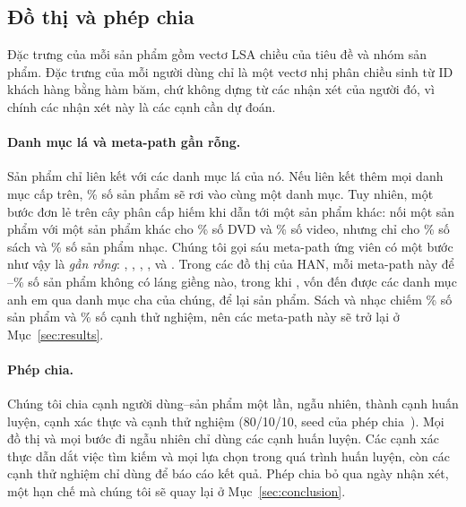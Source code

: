 \subsection{Đồ thị và phép chia}

Đặc trưng của mỗi sản phẩm gồm vectơ
LSA  chiều của tiêu đề và nhóm sản phẩm. Đặc trưng của mỗi người dùng
chỉ là một vectơ nhị phân  chiều sinh từ ID khách hàng bằng hàm băm, chứ không dựng từ các nhận xét của người đó, vì chính các nhận xét
này là các cạnh cần dự đoán.

\paragraph{Danh mục lá và meta-path gần rỗng.} Sản phẩm chỉ liên kết với các danh mục lá của nó.
Nếu liên kết thêm mọi danh mục cấp trên, \% số sản phẩm sẽ rơi vào cùng
một danh mục. Tuy nhiên, một bước đơn lẻ trên cây phân cấp hiếm khi dẫn
tới một sản phẩm khác:  nối một sản phẩm với một sản phẩm khác cho
\% số DVD và \% số video, nhưng chỉ cho
\% số sách và \% số sản phẩm nhạc. Chúng tôi gọi
sáu meta-path ứng viên có một bước như vậy là \emph{gần rỗng}: , ,
, ,  và . Trong các đồ thị của HAN, mỗi meta-path này để --\% số sản phẩm không có láng
giềng nào, trong khi , vốn đến được các danh mục anh em qua danh mục cha của chúng, để
lại  sản phẩm. Sách và nhạc chiếm \% số sản
phẩm và \% số cạnh thử nghiệm, nên các meta-path này sẽ trở lại ở
Mục~\ref{sec:results}.

\paragraph{Phép chia.} Chúng tôi chia  cạnh người dùng--sản phẩm một lần, ngẫu
nhiên, thành  cạnh huấn luyện,  cạnh xác thực và 
cạnh thử nghiệm (80/10/10, seed của phép chia~). Mọi đồ thị và mọi bước đi ngẫu
nhiên chỉ dùng các cạnh huấn luyện. Các cạnh xác thực dẫn dắt việc tìm kiếm và mọi lựa chọn trong
quá trình huấn luyện, còn các cạnh thử nghiệm chỉ dùng để báo cáo kết quả. Phép chia bỏ qua ngày
nhận xét, một hạn chế mà chúng tôi sẽ quay lại ở Mục~\ref{sec:conclusion}.
